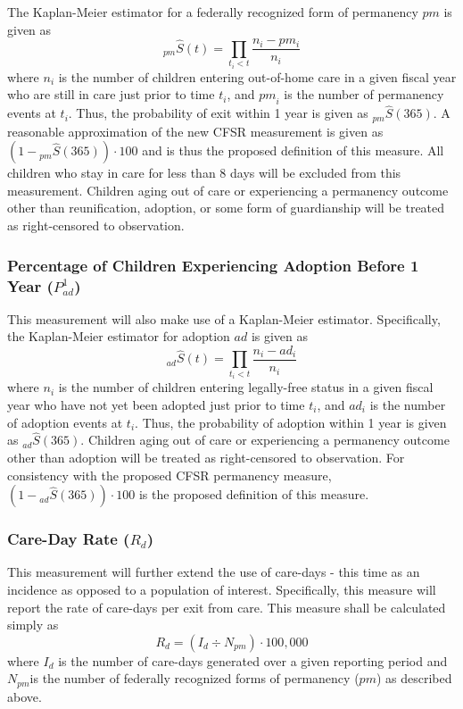 \documentclass[12pt]{article}\usepackage[]{graphicx}\usepackage[]{color}
\begin{document}
The Kaplan-Meier estimator for a federally recognized form of permanency $pm$ is given as
\begin{equation}\label{eq:KM1}
{}_{pm}\hat S(t) = \prod\limits_{t_i<t} \frac{n_i-pm_{i}}{n_i}
\end{equation}
where $n_{i}$ is the number of children entering out-of-home care in a given fiscal year who are still in care just prior to time $t_{i}$, and ${pm}_{i}$ is the number of permanency events at $t_{i}$. Thus, the probability of exit within 1 year is given as ${}_{pm}\hat S(365)$. A reasonable approximation of the new CFSR measurement is given as $(1 - {}_{pm}\hat S(365)) \cdot 100$ and is thus the proposed definition of this measure. All children who stay in care for less than 8 days will be excluded from this measurement. Children aging out of care or experiencing a permanency outcome other than reunification, adoption, or some form of guardianship will be treated as right-censored to observation. 

\subsubsection{Percentage of Children Experiencing Adoption Before 1 Year ($P_{ad}^1$)}

This measurement will also make use of a Kaplan-Meier estimator. Specifically, the Kaplan-Meier estimator for adoption $ad$ is given as
\begin{equation}\label{eq:KM2}
{}_{ad}\hat S(t) = \prod\limits_{t_i<t} \frac{n_i-ad_{i}}{n_i}
\end{equation}
where $n_{i}$ is the number of children entering legally-free status in a given fiscal year who have not yet been adopted just prior to time $t_{i}$, and $ad_{i}$ is the number of adoption events at $t_{i}$. Thus, the probability of adoption within 1 year is given as ${}_{ad}\hat S(365)$. Children aging out of care or experiencing a permanency outcome other than adoption will be treated as right-censored to observation. For consistency with the proposed CFSR permanency measure, $(1 - {}_{ad}\hat S(365)) \cdot 100$ is the proposed definition of this measure.

\subsubsection{Care-Day Rate ($R_d$)}

This measurement will further extend the use of care-days - this time as an incidence as opposed to a population of interest. Specifically, this measure will report the rate of care-days per exit from care. This measure shall be calculated simply as 
\begin{equation}\label{eq:Rd}
R_d = (I_d \div N_{pm}) \cdot 100,000
\end{equation}
where $I_d$ is the number of care-days generated over a given reporting period and $N_{pm}$is the number of federally recognized forms of permanency ($pm$) as described above. 
\end{document}
